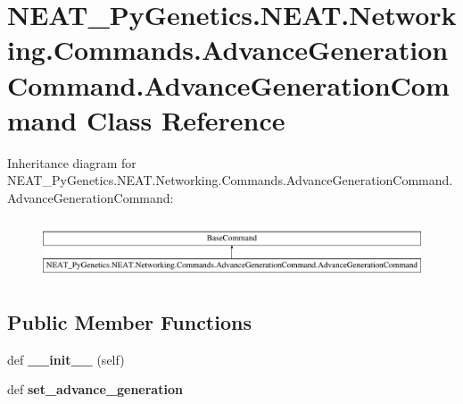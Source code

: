 \hypertarget{class_n_e_a_t___py_genetics_1_1_n_e_a_t_1_1_networking_1_1_commands_1_1_advance_generation_comma5a5bfc6b55fe2df103ab75a9e3d9eebc}{}\section{N\+E\+A\+T\+\_\+\+Py\+Genetics.\+N\+E\+A\+T.\+Networking.\+Commands.\+Advance\+Generation\+Command.\+Advance\+Generation\+Command Class Reference}
\label{class_n_e_a_t___py_genetics_1_1_n_e_a_t_1_1_networking_1_1_commands_1_1_advance_generation_comma5a5bfc6b55fe2df103ab75a9e3d9eebc}
Inheritance diagram for N\+E\+A\+T\+\_\+\+Py\+Genetics.\+N\+E\+A\+T.\+Networking.\+Commands.\+Advance\+Generation\+Command.\+Advance\+Generation\+Command\+:\begin{figure}[H]
\begin{center}
\leavevmode
\includegraphics[height=1.758242cm]{class_n_e_a_t___py_genetics_1_1_n_e_a_t_1_1_networking_1_1_commands_1_1_advance_generation_comma5a5bfc6b55fe2df103ab75a9e3d9eebc}
\end{center}
\end{figure}
\subsection*{Public Member Functions}
\begin{DoxyCompactItemize}
\item 
def {\bfseries \+\_\+\+\_\+init\+\_\+\+\_\+} (self)\hypertarget{class_n_e_a_t___py_genetics_1_1_n_e_a_t_1_1_networking_1_1_commands_1_1_advance_generation_comma5a5bfc6b55fe2df103ab75a9e3d9eebc_aa5c2d4cae5b431359a0563a53f2e8020}{}\label{class_n_e_a_t___py_genetics_1_1_n_e_a_t_1_1_networking_1_1_commands_1_1_advance_generation_comma5a5bfc6b55fe2df103ab75a9e3d9eebc_aa5c2d4cae5b431359a0563a53f2e8020}

\item 
def {\bfseries set\+\_\+advance\+\_\+generation}\hypertarget{class_n_e_a_t___py_genetics_1_1_n_e_a_t_1_1_networking_1_1_commands_1_1_advance_generation_comma5a5bfc6b55fe2df103ab75a9e3d9eebc_a2d1945cf45fc83a8fc73aa690829969d}{}\label{class_n_e_a_t___py_genetics_1_1_n_e_a_t_1_1_networking_1_1_commands_1_1_advance_generation_comma5a5bfc6b55fe2df103ab75a9e3d9eebc_a2d1945cf45fc83a8fc73aa690829969d}

\end{DoxyCompactItemize}


